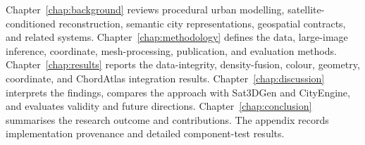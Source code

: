 Chapter~\ref{chap:background} reviews procedural urban modelling,
satellite-conditioned reconstruction, semantic city representations,
geospatial contracts, and related systems.  Chapter~\ref{chap:methodology}
defines the data, large-image inference, coordinate, mesh-processing,
publication, and evaluation methods.  Chapter~\ref{chap:results} reports the
data-integrity, density-fusion, colour, geometry, coordinate, and ChordAtlas
integration results.  Chapter~\ref{chap:discussion}
interprets the findings, compares the approach with Sat3DGen and CityEngine,
and evaluates validity and future directions.  Chapter~\ref{chap:conclusion}
summarises the research outcome and contributions.  The appendix records
implementation provenance and detailed component-test results.
